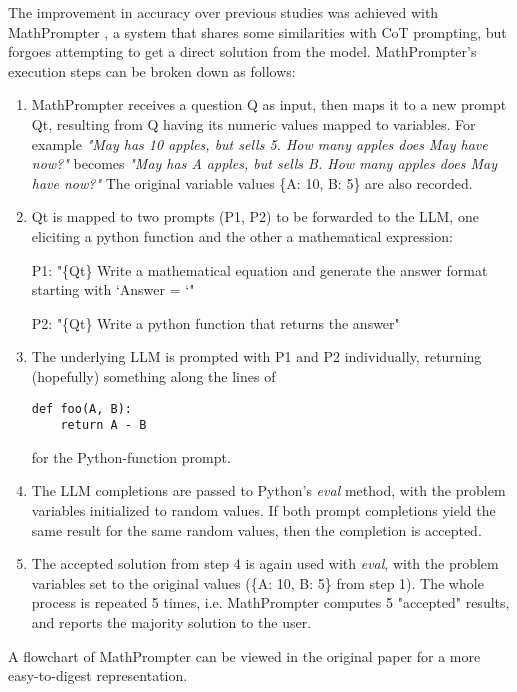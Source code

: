 \label{sec:mp}

The improvement in accuracy over previous studies was achieved with MathPrompter \citep{imani-etal-2023-mathprompter}, a system that shares some similarities with CoT prompting, but forgoes attempting to get a direct solution from the model. MathPrompter's execution steps can be broken down as follows:

\begin{enumerate}
    \item MathPrompter receives a question Q as input, then maps it to a new prompt Qt, resulting from Q having its numeric values mapped to variables. For example \emph{"May has 10 apples, but sells 5. How many apples does May have now?"} becomes \emph{"May has A apples, but sells B. How many apples does May have now?"} The original variable values \{A: 10, B: 5\} are also recorded.

    \item Qt is mapped to two prompts (P1, P2) to be forwarded to the LLM, one eliciting a python function and the other a mathematical expression:

    
    P1: "\{Qt\} Write a mathematical equation and generate the answer format starting with `Answer = `"

    P2: "\{Qt\} Write a python function that returns the answer"

    \item The underlying LLM is prompted with P1 and P2 individually, returning (hopefully) something along the lines of

\begin{verbatim}
def foo(A, B):
    return A - B
\end{verbatim}

    for the Python-function prompt.

    \item The LLM completions are passed to Python's \emph{eval} method, with the problem variables initialized to random values. If both prompt completions yield the same result for the same random values, then the completion is accepted.

    \item The accepted solution from step 4 is again used with \emph{eval}, with the problem variables set to the original values (\{A: 10, B: 5\} from step 1). The whole process is repeated 5 times, i.e. MathPrompter computes 5 "accepted" results, and reports the majority solution to the user.

\end{enumerate}

A flowchart of MathPrompter can be viewed in the original paper for a more easy-to-digest representation.

